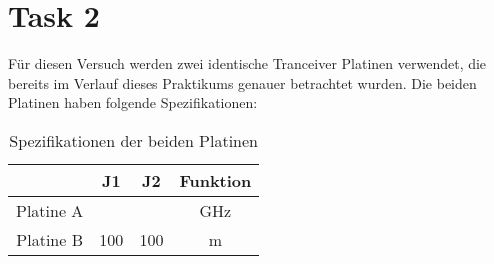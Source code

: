 \section{Task 2}
Für diesen Versuch werden zwei identische Tranceiver Platinen verwendet, die bereits im Verlauf dieses Praktikums genauer betrachtet wurden.
Die beiden Platinen haben folgende Spezifikationen:

\usepackage{pifont,xcolor} %

\begin{table}[h!]
    \centering
    \begin{tabular}{|c|c|c|c|}
        \hline
         & J1 & J2 & Funktion \\
        \hline
        Platine A &  &  & GHz \\
        Platine B & 100 & 100 & m \\
        \hline
    \end{tabular}
    \caption{Spezifikationen der beiden Platinen}
\end{table}
